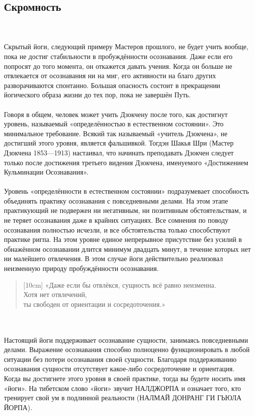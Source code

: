 \subsection{Скромность}
\\ \\ Скрытый йоги, следующий примеру Мастеров прошлого, не будет учить вообще, пока не достиг стабильности в пробуждённости осознавания. Даже если его попросят до того момента, он откажется давать учения. Когда он больше не отвлекается от осознавания ни на миг, его активности на благо других разворачиваются спонтанно. Большая опасность состоит в прекращении йогического образа жизни до тех пор, пока не завершён Путь.
\\ \\ Говоря в общем, человек может учить Дзокчену после того, как достигнут уровень, называемый «определённостью в естественном состоянии». Это минимальное требование. Всякий так называемый «учитель Дзокчена», не достигший этого уровня, является фальшивкой. Тогдэн Шакья Шри (Мастер Дзокчена 1853—1913) настаивал, что начинать преподавать Дзокчен следует только после достижения третьего видения Дзокчена, именуемого «Достижением Кульминации Осознавания».
\\ \\ Уровень «определённости в естественном состоянии» подразумевает способность объединять практику осознавания с повседневными делами. На этом этапе практикующий не подвержен ни негативным, ни позитивным обстоятельствам, и не теряет осознавания даже в крайних ситуациях. Все сомнения по поводу осознавания полностью исчезли, и все обстоятельства только способствуют практике ригпа. На этом уровне единое непрерывное присутствие без усилий в обнажённом осознавании длится минимум двадцать минут, в течение которых нет ни малейшего отвлечения. В этом случае йоги действительно реализовал неизменную природу пробуждённости осознавания.
\begin{verse}[10cm]
«Даже если бы отвлёкся, сущность всё равно неизменна.\\
Хотя нет отвлечений, \\ \indent ты свободен от ориентации и сосредоточения.»
\end{verse}
\\ \\ Настоящий йоги поддерживает осознавание сущности, занимаясь повседневными делами. Выражение осознавания способно полноценно функционировать в любой ситуации без потери осознавания своей сущности. Благодаря поддерживанию осознавания сущности отсутствует какое-либо сосредоточение и ориентация. Когда вы достигнете этого уровня в своей практике, тогда вы будете носить имя «йоги». На тибетском слово «йоги» звучит НАЛДЖОРПА и означает того, кто тренирует свой ум в подлинной реальности (НАЛМАЙ ДОНРАНГ ГИ ГЬЮЛА ЙОРПА).
